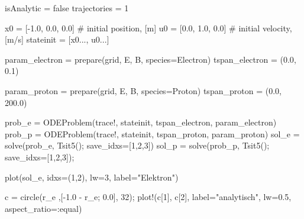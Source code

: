 \documentclass[
  a4paper,
  DIV=11]{scrreprt}
\newenvironment{Shaded}{\begin{snugshade}}{\end{snugshade}}
\newcommand{\CommentTok}[1]{\textcolor[rgb]{0.37,0.37,0.37}{#1}}
\newcommand{\ConstantTok}[1]{\textcolor[rgb]{0.56,0.35,0.01}{#1}}
\newcommand{\FloatTok}[1]{\textcolor[rgb]{0.68,0.00,0.00}{#1}}
\newcommand{\FunctionTok}[1]{\textcolor[rgb]{0.28,0.35,0.67}{#1}}
\newcommand{\NormalTok}[1]{\textcolor[rgb]{0.00,0.23,0.31}{#1}}
\newcommand{\OperatorTok}[1]{\textcolor[rgb]{0.37,0.37,0.37}{#1}}
\newcommand{\StringTok}[1]{\textcolor[rgb]{0.13,0.47,0.30}{#1}}
\begin{document}
\begin{Shaded}
\begin{Highlighting}[]
\NormalTok{isAnalytic }\OperatorTok{=} \ConstantTok{false}
\NormalTok{trajectories }\OperatorTok{=} \FloatTok{1}

\NormalTok{x0 }\OperatorTok{=}\NormalTok{ [}\OperatorTok{{-}}\FloatTok{1.0}\NormalTok{, }\FloatTok{0.0}\NormalTok{, }\FloatTok{0.0}\NormalTok{] }\CommentTok{\# initial position, [m]}
\NormalTok{u0 }\OperatorTok{=}\NormalTok{ [}\FloatTok{0.0}\NormalTok{, }\FloatTok{1.0}\NormalTok{, }\FloatTok{0.0}\NormalTok{] }\CommentTok{\# initial velocity, [m/s]}
\NormalTok{stateinit }\OperatorTok{=}\NormalTok{ [x0}\OperatorTok{...}\NormalTok{, u0}\OperatorTok{...}\NormalTok{]}

\NormalTok{param\_electron }\OperatorTok{=} \FunctionTok{prepare}\NormalTok{(grid, E, B, species}\OperatorTok{=}\NormalTok{Electron)}
\NormalTok{tspan\_electron }\OperatorTok{=}\NormalTok{ (}\FloatTok{0.0}\NormalTok{, }\FloatTok{0.1}\NormalTok{)}

\NormalTok{param\_proton }\OperatorTok{=} \FunctionTok{prepare}\NormalTok{(grid, E, B, species}\OperatorTok{=}\NormalTok{Proton)}
\NormalTok{tspan\_proton }\OperatorTok{=}\NormalTok{ (}\FloatTok{0.0}\NormalTok{, }\FloatTok{200.0}\NormalTok{)}

\NormalTok{prob\_e }\OperatorTok{=} \FunctionTok{ODEProblem}\NormalTok{(trace!, stateinit, tspan\_electron, param\_electron)}
\NormalTok{prob\_p }\OperatorTok{=} \FunctionTok{ODEProblem}\NormalTok{(trace!, stateinit, tspan\_proton, param\_proton)}
\NormalTok{sol\_e }\OperatorTok{=} \FunctionTok{solve}\NormalTok{(prob\_e, }\FunctionTok{Tsit5}\NormalTok{(); save\_idxs}\OperatorTok{=}\NormalTok{[}\FloatTok{1}\NormalTok{,}\FloatTok{2}\NormalTok{,}\FloatTok{3}\NormalTok{])}
\NormalTok{sol\_p }\OperatorTok{=} \FunctionTok{solve}\NormalTok{(prob\_p, }\FunctionTok{Tsit5}\NormalTok{(); save\_idxs}\OperatorTok{=}\NormalTok{[}\FloatTok{1}\NormalTok{,}\FloatTok{2}\NormalTok{,}\FloatTok{3}\NormalTok{]);}
\end{Highlighting}
\end{Shaded}

\begin{Shaded}
\begin{Highlighting}[]
\FunctionTok{plot}\NormalTok{(sol\_e, idxs}\OperatorTok{=}\NormalTok{(}\FloatTok{1}\NormalTok{,}\FloatTok{2}\NormalTok{), lw}\OperatorTok{=}\FloatTok{3}\NormalTok{, label}\OperatorTok{=}\StringTok{"Elektron"}\NormalTok{)}

\NormalTok{c }\OperatorTok{=} \FunctionTok{circle}\NormalTok{(r\_e ,[}\OperatorTok{{-}}\FloatTok{1.0} \OperatorTok{{-}}\NormalTok{ r\_e; }\FloatTok{0.0}\NormalTok{], }\FloatTok{32}\NormalTok{);}
\FunctionTok{plot!}\NormalTok{(c[}\FloatTok{1}\NormalTok{], c[}\FloatTok{2}\NormalTok{], label}\OperatorTok{=}\StringTok{"analytisch"}\NormalTok{, lw}\OperatorTok{=}\FloatTok{0.5}\NormalTok{, aspect\_ratio}\OperatorTok{=:}\NormalTok{equal)}
\end{Highlighting}
\end{Shaded}
\end{document}

